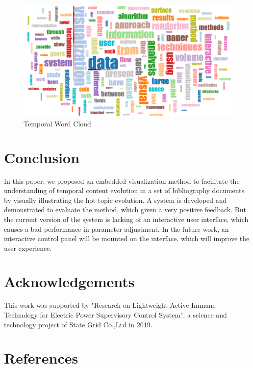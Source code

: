 \documentclass[12pt]{iopart}
\begin{document}
\begin{figure}
	\centering
	\includegraphics[width=.95\textwidth]{images/wordcloud}
	\caption{Temporal Word Cloud}
	\label{fig:twc}
\end{figure}

\section{Conclusion}

In this paper, we proposed an embedded visualization method to facilitate the understanding of temporal content evolution in a set of bibliography documents by visually illustrating the hot topic evolution. A system is developed and demonstrated to evaluate the method, which given a very positive feedback. But the current version of the system is lacking of an interactive user interface, which causes a bad performance in parameter adjustment. In the future work, an interactive control panel will be mounted on the interface, which will improve the user experience.

\section{Acknowledgements}

This work was supported by "Research on Lightweight Active Immune Technology for Electric Power Supervisory Control System", a science and technology project of State Grid Co.,Ltd in 2019.

\section{References}

\end{document}
